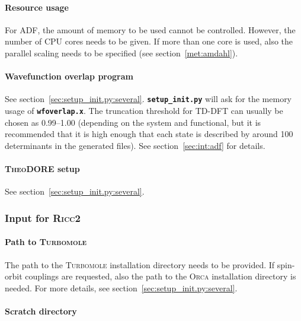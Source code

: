 \documentclass[a4paper,10pt,DIV=15,openany,twoside=false]{scrbook}
\newcommand{\ttt}[1]{\textbf{\texttt{#1}}}
\begin{document}
\paragraph{Resource usage}

For \textsc{ADF}, the amount of memory to be used cannot be controlled. However, the number of CPU cores needs to be given. If more than one core is used, also the parallel scaling needs to be specified (see section~\ref{met:amdahl}).

\paragraph{Wavefunction overlap program}

See section~\ref{sec:setup_init.py:several}. \ttt{setup\_init.py} will ask for the memory usage of \ttt{wfoverlap.x}. The truncation threshold for TD-DFT can usually be chosen as 0.99--1.00 (depending on the system and functional, but it is recommended that it is high enough that each state is described by around 100 determinants in the generated files). See section~\ref{sec:int:adf} for details.

\paragraph{\textsc{TheoDORE} setup}

See section~\ref{sec:setup_init.py:several}. 


\subsubsection{Input for \textsc{Ricc2}}\label{sec:setup_init.py:ricc2}

\paragraph{Path to \textsc{Turbomole}}

The path to the \textsc{Turbomole} installation directory needs to be provided.
If spin-orbit couplings are requested, also the path to the \textsc{Orca} installation directory is needed.
For more details, see section~\ref{sec:setup_init.py:several}.

\paragraph{Scratch directory}
\end{document}
